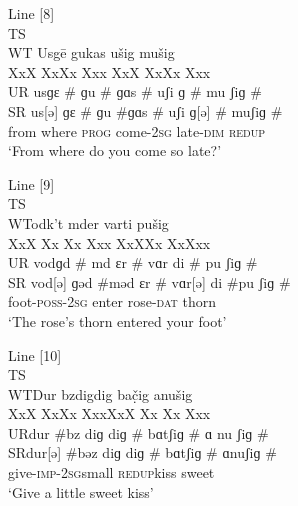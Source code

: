 \documentclass[output=paper,colorlinks,citecolor=brown]{langscibook}
\begin{document}
\begin{paperappendix}
\noindent Line [8]\\
TS \tab   {}\\
WT \tab  Usgē \tab    \tab \tab   gu\tab   kas  \tab  \tab  ušig   \tab \tab    mušig\\
\tab \tab XxX \tab  \tab   Xx\tab   Xx \tab  Xxx \tab  \tab  XxX  \tab  Xx\tab   Xx \tab  Xxx \\
UR  \tab us\tab    \tab   ɡɛ \# \tab  ɡu \# \tab  ɡɑs \#  \tab \tab    uʃi  \tab   ɡ \#  \tab  mu \tab  ʃiɡ \#\\
SR \tab  us[ə] \tab   \tab   ɡɛ \# \tab  ɡu \#\tab   ɡɑs \# \tab  \tab    uʃi \tab    ɡ[ə] \#  \tab  mu\tab   ʃiɡ \#\\
\tab \tab from where \tab   \tab  \textsc{prog}  come-2\textsc{sg} \tab  late-\textsc{dim} \tab    \textsc{redup}\\
‘From where do you come so late?’\medskip

\noindent Line [9]\\
TS\tab    {}\\
WT\tab   odk’t  \tab  \tab \tab    mder \tab     \tab  varti \tab     \tab  pušig\\
\tab \tab XxX  \tab \tab   Xx \tab  Xx \tab  Xxx \tab   XxX\tab     Xx \tab  Xx\tab   Xxx\\
UR \tab  vod\tab   \tab   ɡd \# \tab  md \tab   ɛr \#  \tab    vɑr  \tab   di \# \tab  pu \tab  ʃiɡ \#\\
SR \tab  vod[ə]  \tab \tab   ɡəd \#\tab   məd \tab   ɛr \#  \tab    vɑr[ə]  \tab   di \#\tab   pu \tab  ʃiɡ \#\\
\tab \tab foot-\textsc{poss-2sg} \tab  enter \tab \tab      rose-\textsc{dat}   \tab   thorn\\
‘The rose’s thorn entered your foot’\medskip

\noindent Line [10]\\
TS\tab   {}\\
WT\tab   Dur \tab  \tab   bzdig\tab   \tab   dig \tab    bač̣ig  \tab   \tab anušig\\
\tab \tab XxX \tab \tab     Xx\tab   Xx \tab  Xxx\tab     XxX  \tab \tab   Xx \tab  Xx \tab  Xxx\\
UR\tab   dur \#\tab  \tab    bz \tab  diɡ \tab   diɡ \#   \tab  bɑtʃiɡ \# \tab  ɑ  \tab nu \tab  ʃiɡ \#\\
SR\tab   dur[ə] \#\tab   bəz \tab  diɡ \tab  diɡ \#  \tab   bɑtʃiɡ \# \tab  ɑ\tab   nu\tab   ʃiɡ \#\\
\tab \tab give-\textsc{imp-2sg}\tab   small  \tab  \tab  \textsc{redup}\tab   kiss \tab  \tab   sweet\\
‘Give a little sweet kiss’\medskip


\end{paperappendix}
\end{document}
